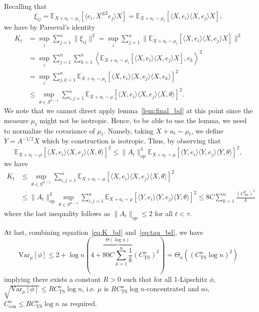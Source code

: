 Recalling that
\[\xi_{ij} = \mathbb{E}_{X + a_t \sim \mu_t}[\langle e_i, X^{\otimes 2} e_j\rangle X] = 
  \mathbb{E}_{X + a_t \sim \mu_t}[\langle X, e_i\rangle \langle X, e_j\rangle X],\]
we have by Parseval's identity 
\begin{align*}
  K_t & = \sup_i \sum_{j = 1}^n \|\xi_{ij}\|^2 
    = \sup_i \sum_{j = 1}^n \|\mathbb{E}_{X + a_t \sim \mu_t}[\langle X, e_i\rangle \langle X, e_j\rangle X]\|^2\\
  & = \sup_i \sum_{j = 1}^n \sum_{k = 1}^n 
    \left\langle \mathbb{E}_{X + a_t \sim \mu_t}[\langle X, e_i\rangle \langle X, e_j\rangle X], e_k\right\rangle^2\\
  & = \sup_i \sum_{j, k = 1}^n \mathbb{E}_{X + a_t \sim \mu_t}[\langle X, e_i\rangle \langle X, e_j\rangle \langle X, e_k\rangle]^2\\
  & \le \sup_{\theta \in S^{n - 1}}\sum_{i, j = 1}^n 
    \mathbb{E}_{X + a_t \sim \mu}[\langle X, e_i\rangle \langle X, e_j\rangle \langle X, \theta\rangle]^2.
\end{align*}
We note that we cannot direct apply lemma~\ref{lem:final_bd} at this point since the measure \(\mu_t\) 
might not be isotropic. Hence, to be able to use the lemma, we need to normalize the covariance of \(\mu_t\). 
Namely, taking \(X + a_t \sim \mu_t\), we define \(Y = A^{-1/2} X\) which by construction is isotropic. 
Thus, by observing that 
\[\mathbb{E}_{X + a_t \sim \mu}[\langle X, e_i\rangle \langle X, e_j\rangle \langle X, \theta\rangle]^2 
  \le \|A_t\|_{\text{op}}^3 \mathbb{E}_{X + a_t \sim \mu}[\langle Y, e_i\rangle \langle Y, e_j\rangle \langle Y, \theta\rangle]^2,\]
we have 
\begin{equation}\label{eq:K_bd}
  \begin{split}
    K_t & \le \sup_{\theta \in S^{n - 1}}\sum_{i, j = 1}^n 
        \mathbb{E}_{X + a_t \sim \mu}[\langle X, e_i\rangle \langle X, e_j\rangle \langle X, \theta\rangle]^2\\
      & \le \|A_t\|_{\text{op}}^3 \sup_{\theta \in S^{n - 1}}\sum_{i, j = 1}^n 
        \mathbb{E}_{X + a_t \sim \mu}[\langle Y, e_i\rangle \langle Y, e_j\rangle \langle Y, \theta\rangle]^2
        \le 8 C \sum_{k = 1}^n \frac{(C_{\text{TS}}^n)^2}{k}
      \end{split}
\end{equation}
where the last inequality follows as \(\|A_t\|_{\text{op}} \le 2\) for all \(t < \tau\). 
    
At last, combining equation~\eqref{eq:K_bd} and~\eqref{eq:tau_bd}, we have
\[\text{Var}_\mu[\phi] \le 2 + \log n\left(4 + \overbrace{80 C \sum_{k = 1}^n \frac{1}{k}}^{\Theta(\log n)}(C_{\text{TS}}^n)^2\right)
   = \Theta_n((C_{\text{TS}}^n \log n)^2)\]
implying there exists a constant \(R > 0\) such that for all 1-Lipschitz \(\phi\), 
\(\sqrt{\text{Var}_\mu[\phi]} \le R C_{\text{TS}}^n \log n\), i.e. \(\mu\) is 
\(R C_{\text{TS}}^n \log n\)-concentrated and so, \(C_{\text{con}}^n \le R C_{\text{TS}}^n \log n\)
as required.

